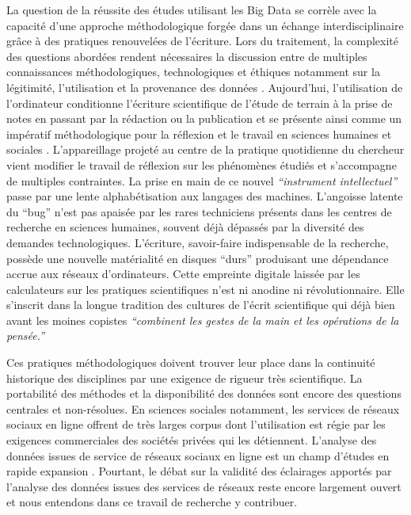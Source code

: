 La question de la réussite des études utilisant les Big Data se corrèle avec la capacité d{\textquoteright}une approche méthodologique forgée dans un échange interdisciplinaire grâce à des pratiques renouvelées de l{\textquoteright}écriture. Lors du traitement, la complexité des questions abordées rendent nécessaires la discussion entre de multiples connaissances méthodologiques, technologiques et éthiques notamment sur la légitimité, l'utilisation et la provenance des données \citep{Boyd2011}. Aujourd{\textquoteright}hui, l{\textquoteright}utilisation de l{\textquoteright}ordinateur conditionne l{\textquoteright}écriture scientifique de l{\textquoteright}étude de terrain à la prise de notes en passant par la rédaction ou la publication et se présente ainsi comme un impératif méthodologique pour la réflexion et le travail en sciences humaines et sociales \citep{Wieviorka2013}. L{\textquoteright}appareillage projeté au centre de la pratique quotidienne du chercheur vient modifier le travail de réflexion sur les phénomènes étudiés et s{\textquoteright}accompagne de multiples contraintes. La prise en main de ce nouvel \textit{{\textquotedblleft}instrument intellectuel{\textquotedblright} }\citep{Guichard2014} passe par une lente alphabétisation aux langages des machines. L{\textquoteright}angoisse latente du {\textquotedblleft}bug{\textquotedblright} n{\textquoteright}est pas apaisée par les rares techniciens présents dans les centres de recherche en sciences humaines, souvent déjà dépassés par la diversité des demandes technologiques. L{\textquoteright}écriture, savoir-faire indispensable de la recherche, possède une nouvelle matérialité en disques ``durs'' produisant une dépendance accrue aux réseaux d{\textquoteright}ordinateurs. Cette empreinte digitale laissée par les calculateurs sur les pratiques scientifiques n{\textquoteright}est ni anodine ni révolutionnaire. Elle s{\textquoteright}inscrit dans la longue tradition des cultures de l{\textquoteright}écrit scientifique qui déjà bien avant les moines copistes \textit{{\textquotedblleft}combinent les gestes de la main et les opérations de la pensée.{\textquotedblright}} \citep{Jacob2011}  

Ces pratiques méthodologiques doivent trouver leur place dans la continuité historique des disciplines par une exigence de rigueur très scientifique. La portabilité des méthodes et la disponibilité des données sont encore des questions centrales et non-résolues. En sciences sociales notamment, les services de réseaux sociaux en ligne offrent de très larges corpus dont l{\textquoteright}utilisation est régie par les exigences commerciales des sociétés privées qui les détiennent. L{\textquoteright}analyse des données issues de service de réseaux sociaux en ligne est un champ d{\textquoteright}études en rapide expansion \citep{Nettleton2013}. Pourtant, le débat sur la validité des éclairages apportés par l{\textquoteright}analyse des données issues des services de réseaux reste encore largement ouvert et nous entendons dans ce travail de recherche y contribuer.

